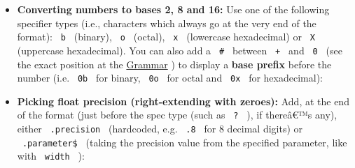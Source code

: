 \begin{itemize}
\tightlist
\item
  \textbf{Converting numbers to bases 2, 8 and 16:} Use one of the
  following specifier types (i.e., characters which always go at the
  very end of the format): \texttt{\ b\ } (binary), \texttt{\ o\ }
  (octal), \texttt{\ x\ } (lowercase hexadecimal) or \texttt{\ X\ }
  (uppercase hexadecimal). You can also add a \texttt{\ \#\ } between
  \texttt{\ +\ } and \texttt{\ 0\ } (see the exact position at the
  \href{https://github.com/typst/packages/raw/main/packages/preview/oxifmt/0.2.1/\#grammar}{Grammar}
  ) to display a \textbf{base prefix} before the number (i.e.
  \texttt{\ 0b\ } for binary, \texttt{\ 0o\ } for octal and
  \texttt{\ 0x\ } for hexadecimal):
\end{itemize}

\begin{Shaded}
\begin{Highlighting}[]

\end{Highlighting}
\end{Shaded}

\begin{itemize}
\tightlist
\item
  \textbf{Picking float precision (right-extending with zeroes):} Add,
  at the end of the format (just before the spec type (such as
  \texttt{\ ?\ } ), if thereâ€™s any), either \texttt{\ .precision\ }
  (hardcoded, e.g. \texttt{\ .8\ } for 8 decimal digits) or
  \texttt{\ .parameter\$\ } (taking the precision value from the
  specified parameter, like with \texttt{\ width\ } ):
\end{itemize}

\begin{Shaded}
\begin{Highlighting}[]

\end{Highlighting}
\end{Shaded}

